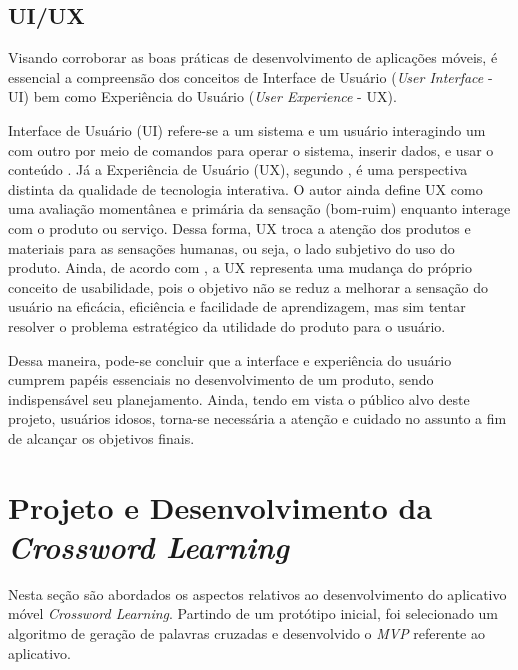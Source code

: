 \subsection{UI/UX}
Visando corroborar as boas práticas de desenvolvimento de aplicações móveis, é essencial a compreensão dos conceitos de Interface de Usuário (\textit{User Interface} - UI) bem como Experiência do Usuário (\textit{User Experience} - UX). %

Interface de Usuário (UI) refere-se a um sistema e um usuário interagindo um com outro por meio de comandos para operar o sistema, inserir dados, e usar o conteúdo \citep{joo2015}. Já a Experiência de Usuário (UX), segundo \cite{marc2008}, é uma perspectiva distinta da qualidade de tecnologia interativa. O autor ainda define UX como uma avaliação momentânea e primária da sensação (bom-ruim) enquanto interage com o produto ou serviço. Dessa forma, UX troca a atenção dos produtos e materiais para as sensações humanas, ou seja, o lado subjetivo do uso do produto. Ainda, de acordo com \cite{castilla2017}, a UX representa uma mudança do próprio conceito de usabilidade, pois o objetivo não se reduz a melhorar a sensação do usuário na eficácia, eficiência e facilidade de aprendizagem, mas sim tentar resolver o problema estratégico da utilidade do produto para o usuário. 

Dessa maneira, pode-se concluir que a interface e experiência do usuário cumprem papéis essenciais no desenvolvimento de um produto, sendo indispensável seu planejamento. Ainda, tendo em vista o público alvo deste projeto, usuários idosos, torna-se necessária a atenção e cuidado no assunto a fim de alcançar os objetivos finais.


\section{Projeto e Desenvolvimento da \textit{Crossword Learning}}
Nesta seção são abordados os aspectos relativos ao desenvolvimento do aplicativo móvel \textit{Crossword Learning}. Partindo de um protótipo inicial, foi selecionado um algoritmo de geração de palavras cruzadas e desenvolvido o \textit{MVP} referente ao aplicativo.

